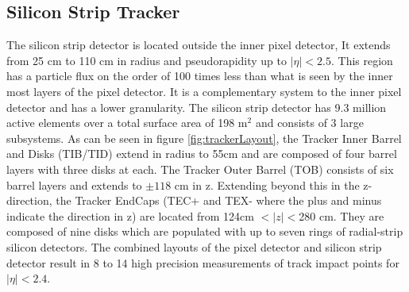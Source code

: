 \subsection{Silicon Strip Tracker}
The silicon strip detector is located outside the inner pixel detector, 
It extends from 25 cm to 110 cm in radius and pseudorapidity up to $|\eta|<2.5$. 
This region has a particle flux on 
the order of 100 times less than what is seen by the inner most layers of 
the pixel detector. It is a complementary system to the inner pixel
detector and has a lower granularity. The silicon strip detector 
has 9.3 million active elements over a total surface area of 198 m$^{2}$
and consists of 3 large subsystems. As can be seen in figure \ref{fig:trackerLayout}, 
the Tracker Inner Barrel and Disks (TIB/TID) extend in radius to
55cm and are composed of four barrel layers with three disks at each.
The Tracker Outer Barrel (TOB) consists of six barrel layers and extends to $\pm118$ cm
in z. Extending beyond this in the z-direction, the Tracker EndCaps (TEC+ and TEX- where the plus and minus
indicate the direction in z) are located from 124cm $<|z|<$280 cm. They are composed of 
nine disks which are populated with up to seven rings of radial-strip silicon detectors.
The combined layouts of the pixel detector and silicon strip detector
result in 8 to 14 high precision measurements of track impact points for 
$|\eta|<2.4$.